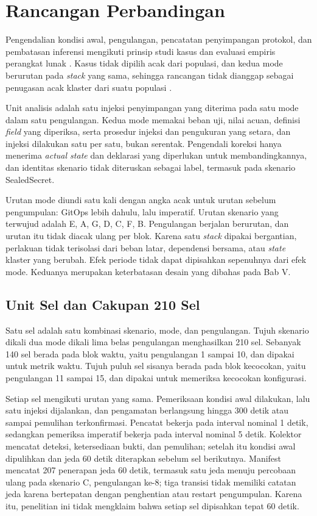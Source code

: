 \section{Rancangan Perbandingan}

Pengendalian kondisi awal, pengulangan, pencatatan penyimpangan protokol, dan pembatasan inferensi mengikuti prinsip studi kasus dan evaluasi empiris perangkat lunak \citep{wohlin2012experimentation,runeson2009case}. Kasus tidak dipilih acak dari populasi, dan kedua mode berurutan pada \textit{stack} yang sama, sehingga rancangan tidak dianggap sebagai penugasan acak klaster dari suatu populasi \citep{cook1979quasi}.

Unit analisis adalah satu injeksi penyimpangan yang diterima pada satu mode dalam satu pengulangan. Kedua mode memakai beban uji, nilai acuan, definisi \textit{field} yang diperiksa, serta prosedur injeksi dan pengukuran yang setara, dan injeksi dilakukan satu per satu, bukan serentak. Pengendali koreksi hanya menerima \textit{actual state} dan deklarasi yang diperlukan untuk membandingkannya, dan identitas skenario tidak diteruskan sebagai label, termasuk pada skenario SealedSecret.

Urutan mode diundi satu kali dengan angka acak untuk urutan sebelum pengumpulan: GitOps lebih dahulu, lalu imperatif. Urutan skenario yang terwujud adalah E, A, G, D, C, F, B. Pengulangan berjalan berurutan, dan urutan itu tidak diacak ulang per blok. Karena satu \textit{stack} dipakai bergantian, perlakuan tidak terisolasi dari beban latar, dependensi bersama, atau \textit{state} klaster yang berubah. Efek periode tidak dapat dipisahkan sepenuhnya dari efek mode. Keduanya merupakan keterbatasan desain yang dibahas pada Bab V.

\subsection{Unit Sel dan Cakupan 210 Sel}
\label{sec:unit-sel}

Satu sel adalah satu kombinasi skenario, mode, dan pengulangan. Tujuh skenario dikali dua mode dikali lima belas pengulangan menghasilkan 210 sel. Sebanyak 140 sel berada pada blok waktu, yaitu pengulangan 1 sampai 10, dan dipakai untuk metrik waktu. Tujuh puluh sel sisanya berada pada blok kecocokan, yaitu pengulangan 11 sampai 15, dan dipakai untuk memeriksa kecocokan konfigurasi.

Setiap sel mengikuti urutan yang sama. Pemeriksaan kondisi awal dilakukan, lalu satu injeksi dijalankan, dan pengamatan berlangsung hingga 300 detik atau sampai pemulihan terkonfirmasi. Pencatat bekerja pada interval nominal 1 detik, sedangkan pemeriksa imperatif bekerja pada interval nominal 5 detik. Kolektor mencatat deteksi, ketersediaan bukti, dan pemulihan; setelah itu kondisi awal dipulihkan dan jeda 60 detik diterapkan sebelum sel berikutnya. Manifest mencatat 207 penerapan jeda 60 detik, termasuk satu jeda menuju percobaan ulang pada skenario C, pengulangan ke-8; tiga transisi tidak memiliki catatan jeda karena bertepatan dengan penghentian atau restart pengumpulan. Karena itu, penelitian ini tidak mengklaim bahwa setiap sel dipisahkan tepat 60 detik.

